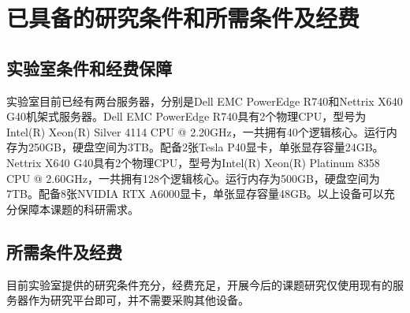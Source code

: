 
\chapter{已具备的研究条件和所需条件及经费}

\section{实验室条件和经费保障}
实验室目前已经有两台服务器，分别是Dell EMC PowerEdge R740和Nettrix X640 G40机架式服务器。Dell EMC PowerEdge R740具有2个物理CPU，型号为Intel(R) Xeon(R) Silver 4114 CPU @ 2.20GHz，一共拥有40个逻辑核心。运行内存为250GB，硬盘空间为3TB。配备2张Tesla P40显卡，单张显存容量24GB。Nettrix X640 G40具有2个物理CPU，型号为Intel(R) Xeon(R) Platinum 8358 CPU @ 2.60GHz，一共拥有128个逻辑核心。运行内存为500GB，硬盘空间为7TB。配备8张NVIDIA RTX A6000显卡，单张显存容量48GB。以上设备可以充分保障本课题的科研需求。

\section{所需条件及经费}
目前实验室提供的研究条件充分，经费充足，开展今后的课题研究仅使用现有的服务器作为研究平台即可，并不需要采购其他设备。